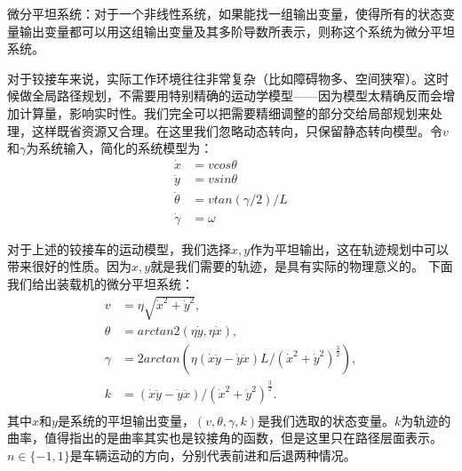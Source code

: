 \documentclass[master,academic]{ysuthesis} %
\begin{document}
		微分平坦系统：对于一个非线性系统，如果能找一组输出变量，使得所有的状态变量输出变量都可以用这组输出变量及其多阶导数所表示，则称这个系统为微分平坦系统。

		对于铰接车来说，实际工作环境往往非常复杂（比如障碍物多、空间狭窄）。这时候做全局路径规划，不需要用特别精确的运动学模型——因为模型太精确反而会增加计算量，影响实时性。我们完全可以把需要精细调整的部分交给局部规划来处理，这样既省资源又合理。在这里我们忽略动态转向，只保留静态转向模型。令$v$和$\gamma$为系统输入，简化的系统模型为：
		\begin{equation}
			\begin{aligned}
				\dot{x} &= vcos\theta\\
				\dot{y} &= vsin\theta\\
				\dot{\theta} &= vtan( \gamma /2 ) /L\\
				\dot{\gamma} &= \omega
			\end{aligned}
		\end{equation}
	

		对于上述的铰接车的运动模型，我们选择$x,y$作为平坦输出，这在轨迹规划中可以带来很好的性质。因为$x,y$就是我们需要的轨迹，是具有实际的物理意义的。
		下面我们给出装载机的微分平坦系统：
		\begin{equation}
			\begin{aligned}
				v&=\eta \sqrt{\dot{x}^2+\dot{y}^2},\\
				\theta &=arctan2( \eta \dot{y},\eta \dot{x} ) ,\\
				\gamma &=2arctan( \eta ( \dot{x}\ddot{y}-\dot{y}\ddot{x} ) L/( \dot{x}^2+\dot{y}^2 ) ^{\frac{3}{2}} ) ,\\
				k&=( \dot{x}\ddot{y}-\dot{y}\ddot{x} ) /( \dot{x}^2+\dot{y}^2 ) ^{\frac{3}{2}}.\\
			\end{aligned}
		\end{equation}
	其中$x$和$y$是系统的平坦输出变量，$(v,\theta,\gamma,k)$是我们选取的状态变量。$k$为轨迹的曲率，值得指出的是曲率其实也是铰接角的函数，但是这里只在路径层面表示。$n\in\{-1,1\}$是车辆运动的方向，分别代表前进和后退两种情况。
\end{document}
